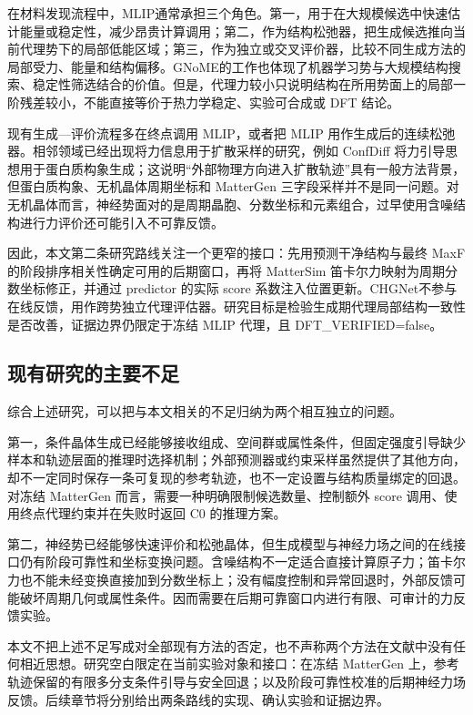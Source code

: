 在材料发现流程中，MLIP通常承担三个角色。第一，用于在大规模候选中快速估计能量或稳定性，减少昂贵计算调用；第二，作为结构松弛器，把生成候选推向当前代理势下的局部低能区域；第三，作为独立或交叉评价器，比较不同生成方法的局部受力、能量和结构偏移。GNoME的工作也体现了机器学习势与大规模结构搜索、稳定性筛选结合的价值\citep{merchant2023}。但是，代理力较小只说明结构在所用势面上的局部一阶残差较小，不能直接等价于热力学稳定、实验可合成或 DFT 结论。

现有生成---评价流程多在终点调用 MLIP，或者把 MLIP 用作生成后的连续松弛器。相邻领域已经出现将力信息用于扩散采样的研究，例如 ConfDiff 将力引导思想用于蛋白质构象生成\citep{wang2024}；这说明``外部物理方向进入扩散轨迹''具有一般方法背景，但蛋白质构象、无机晶体周期坐标和 MatterGen 三字段采样并不是同一问题。对无机晶体而言，神经势面对的是周期晶胞、分数坐标和元素组合，过早使用含噪结构进行力评价还可能引入不可靠反馈。

因此，本文第二条研究路线关注一个更窄的接口：先用预测干净结构与最终 MaxF 的阶段排序相关性确定可用的后期窗口，再将 Matter\allowbreak Sim 笛卡尔力映射为周期分数坐标修正，并通过 predictor 的实际 score 系数注入位置更新。CHGNet不参与在线反馈，用作跨势独立代理评估器。研究目标是检验生成期代理局部结构一致性是否改善，证据边界仍限定于冻结 MLIP 代理，且 DFT\_VERIFIED=false。

\subsection{现有研究的主要不足}

综合上述研究，可以把与本文相关的不足归纳为两个相互独立的问题。

第一，条件晶体生成已经能够接收组成、空间群或属性条件，但固定强度引导缺少样本和轨迹层面的推理时选择机制；外部预测器或约束采样虽然提供了其他方向，却不一定同时保存一条可复现的参考轨迹，也不一定设置与结构质量绑定的回退。对冻结 MatterGen 而言，需要一种明确限制候选数量、控制额外 score 调用、使用终点代理约束并在失败时返回 C0 的推理方案。

第二，神经势已经能够快速评价和松弛晶体，但生成模型与神经力场之间的在线接口仍有阶段可靠性和坐标变换问题。含噪结构不一定适合直接计算原子力；笛卡尔力也不能未经变换直接加到分数坐标上；没有幅度控制和异常回退时，外部反馈可能破坏周期几何或属性条件。因而需要在后期可靠窗口内进行有限、可审计的力反馈实验。

本文不把上述不足写成对全部现有方法的否定，也不声称两个方法在文献中没有任何相近思想。研究空白限定在当前实验对象和接口：在冻结 MatterGen 上，参考轨迹保留的有限多分支条件引导与安全回退；以及阶段可靠性校准的后期神经力场反馈。后续章节将分别给出两条路线的实现、确认实验和证据边界。

